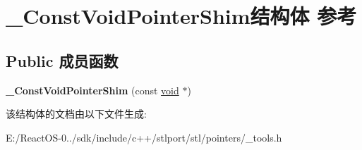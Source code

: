 \hypertarget{struct___const_void_pointer_shim}{}\section{\+\_\+\+Const\+Void\+Pointer\+Shim结构体 参考}
\label{struct___const_void_pointer_shim}
\subsection*{Public 成员函数}
\begin{DoxyCompactItemize}
\item 
\mbox{\label{struct___const_void_pointer_shim_a3111b8d160e8590e44dc43487aa398cd}} 
{\bfseries \+\_\+\+Const\+Void\+Pointer\+Shim} (const \hyperlink{interfacevoid}{void} $\ast$)
\end{DoxyCompactItemize}


该结构体的文档由以下文件生成\+:\begin{DoxyCompactItemize}
\item 
E\+:/\+React\+O\+S-\/0../sdk/include/c++/stlport/stl/pointers/\+\_\+tools.\+h\end{DoxyCompactItemize}
